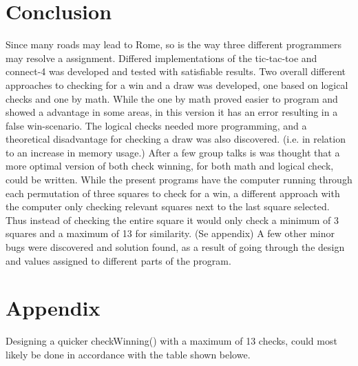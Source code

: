 \documentclass[a4paper,10pt]{article}
\begin{document}
	\begin{comment}
	I testing skal i forklare jeres tests osv. udover det kan i have et billede med
	som i kan tilføje ved at kopiere includegraphics som herunder.
	
	\begin{figure}[H]\center
	\texttt{[image: billede.png]}
	\caption{}
	\end{figure}
	
	udskift billede.png med jeres billede fil som skal ligge i samme mappe som .tex
	i kan ændre på scale for at �?¦ndre p�?¥ billede størrelse i pdfen.
	\end{comment}
	
	
	\section{Conclusion} 
	Since many roads may lead to Rome, so is the way three different programmers may resolve a assignment. Differed implementations of the tic-tac-toe and connect-4 was developed and tested with satisfiable results. Two overall different approaches to checking for a win and a draw was developed, one based on logical checks and one by math. While the one by math proved easier to program and showed a advantage in some areas, in this version it has an error resulting in a false win-scenario. The logical checks needed more programming, and a theoretical disadvantage for checking a draw was also discovered. (i.e. in relation to an increase in memory usage.) 
	After a few group talks is was thought that a more optimal version of both check winning, for both math and logical check, could be written. While the present programs have the computer running through each permutation of three squares to check for a win, a different approach with the computer only checking relevant squares next to the last square selected. Thus instead of checking the entire square it would only check a minimum of 3 squares and a maximum of 13 for similarity. (Se appendix)
	A few other minor bugs were discovered and solution found, as a result of going through the design and values assigned to different parts of the program.
	
	
	
	
	\section{Appendix}
	
	Designing a quicker checkWinning() with a maximum of 13 checks, could most likely be done in accordance with the table shown belowe.   
	
\end{document}
